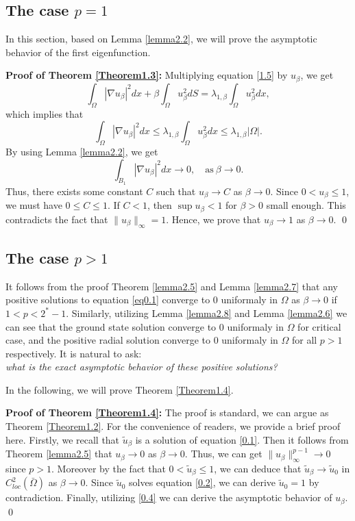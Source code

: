 \documentclass[12pt,reqno]{amsart}
\numberwithin{equation}{section}
\theoremstyle{definition}
\begin{document}
\subsection{The case $p=1$}
In this section,  based on Lemma \ref{lemma2.2}, we will prove the asymptotic behavior of the first eigenfunction. 


{\bf Proof of Theorem \ref{Theorem1.3}:} 
Multiplying equation \eqref{1.5} by $u_\beta$, we get 
$$
\int_{\Omega}|\nabla u_\beta|^2dx+\beta\int_{\Omega}u_\beta^2dS=\lambda_{1,\beta}\int_{\Omega}u_\beta^2dx,
$$
which implies that 
$$
\int_{\Omega}|\nabla u_\beta|^2dx\leq \lambda_{1,\beta}\int_{\Omega}u_\beta^2dx\leq \lambda_{1,\beta}|\Omega|.
$$
By using Lemma \ref{lemma2.2}, we get 
$$
\int_{B_1}|\nabla u_\beta|^2dx\to 0,\quad \text{as}\ \beta\to0.
$$
Thus, there exists some constant $C$ such that $u_\beta\to C$ as $\beta\to 0$. Since $0<u_\beta\leq 1$, we must have $0\leq C\leq 1$. If $C<1$, then $\sup u_\beta < 1$ for $\beta>0$ small enough. This contradicts the fact that $\|u_\beta\|_\infty=1$. Hence, we prove that $u_\beta\to 1$ as $\beta\to 0$.
\qed



\subsection{The case $p>1$}\label{s5}
It follows from the proof Theorem \ref{lemma2.5} and Lemma \ref{lemma2.7} that any positive solutions to equation \eqref{eq0.1} converge to 0 uniformaly in $\Omega$ as $\beta\to 0$ if $1<p<2^*-1$. Similarly, utilizing Lemma \ref{lemma2.8} and Lemma \ref{lemma2.6} we can see that the ground state solution converge to 0 uniformaly in $\Omega$ for critical case, and the positive radial solution converge to 0 uniformaly in $\Omega$ for all $p>1$ respectively.
It is natural to ask:  \\
{\em what is the exact asymptotic behavior of these positive solutions?}

In the following, we will prove Theorem \ref{Theorem1.4}.


{\bf Proof of Theorem \ref{Theorem1.4}:}
The proof is standard, we can argue as Theorem \ref{Theorem1.2}. For the convenience of readers, we provide a brief proof here. Firstly, we recall that $\tilde{u}_\beta$ is a solution of equation \eqref{0.1}. Then it follows from Theorem \ref{lemma2.5}  that $u_\beta\to 0$ as $\beta\to 0$. Thus, we can get $\|u_\beta\|^{p-1}_\infty\to 0$ since $p>1$. Moreover by the fact that $0<\tilde{u}_\beta\le 1$, we can deduce that $\tilde{u}_\beta\to \tilde{u}_0$ in $C^2_{loc}(\bar{\Omega})$ as $\beta\to0$. Since $\tilde{u}_0$ solves equation \eqref{0.2}, we can derive  $\tilde{u}_0=1$ by contradiction. Finally, utilizing \eqref{0.4} we can derive  the asymptotic behavior of $u_\beta$.
\qed





 
\end{document}
